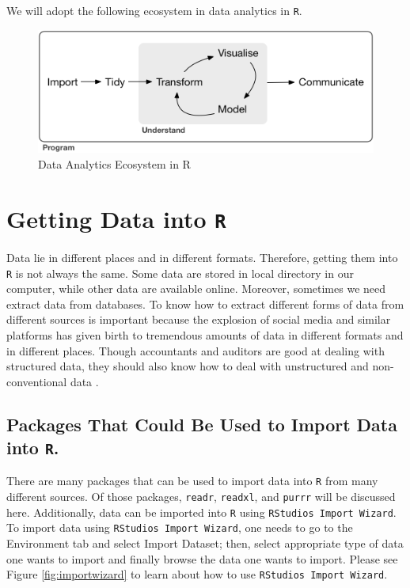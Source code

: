 \documentclass[
]{book}
\begin{document}
We will adopt the following ecosystem in data analytics in \texttt{R}.

\begin{figure}

{\centering \includegraphics{images/data-science} 

}

\caption{Data Analytics Ecosystem in R}\label{fig:unnamed-chunk-2}
\end{figure}

\hypertarget{getting-data-into-r}{%
\chapter{\texorpdfstring{Getting Data into \texttt{R}}{Getting Data into R}}\label{getting-data-into-r}}

Data lie in different places and in different formats. Therefore, getting them into \texttt{R} is not always the same. Some data are stored in local directory in our computer, while other data are available online. Moreover, sometimes we need extract data from databases. To know how to extract different forms of data from different sources is important because the explosion of social media and similar platforms has given birth to tremendous amounts of data in different formats and in different places. Though accountants and auditors are good at dealing with structured data, they should also know how to deal with unstructured and non-conventional data \citep{richins_big_2017}.

\hypertarget{packages-that-could-be-used-to-import-data-into-r.}{%
\section{\texorpdfstring{Packages That Could Be Used to Import Data into \texttt{R}.}{Packages That Could Be Used to Import Data into R.}}\label{packages-that-could-be-used-to-import-data-into-r.}}

There are many packages that can be used to import data into \texttt{R} from many different sources. Of those packages, \texttt{readr}, \texttt{readxl}, and \texttt{purrr} will be discussed here. Additionally, data can be imported into \texttt{R} using \texttt{RStudio\textquotesingle{}s\ Import\ Wizard}. To import data using \texttt{RStudio\textquotesingle{}s\ Import\ Wizard}, one needs to go to the Environment tab and select Import Dataset; then, select appropriate type of data one wants to import and finally browse the data one wants to import. Please see Figure \ref{fig:importwizard} to learn about how to use \texttt{RStudio\textquotesingle{}s\ Import\ Wizard}.
\end{document}
